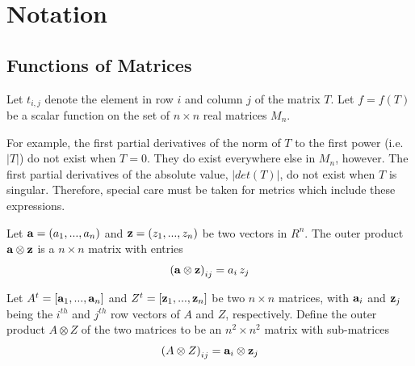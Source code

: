 \documentclass{report}
\begin{document}
\chapter{Notation}

\section{Functions of Matrices}

Let $t_{i,j}$ denote the element in row $i$ and column $j$ of the matrix $T$.
Let $f=f(T)$ be a scalar function on the set of $n \times n$ real matrices 
$M_n$. \newline

 For example, the first partial
derivatives of the norm of $T$ to the first power (i.e. $|T|$) do not exist 
when $T=0$. 
They do exist everywhere else in $M_n$, however.  The first partial 
derivatives of 
the absolute value, $|det(T)|$, do not exist when $T$ is singular. Therefore,
special care must be taken for metrics which include these expressions. 
\newline

 \newline
Let ${\bf a}=(a_1,...,a_n)$ and ${\bf z}=(z_1,...,z_n)$ be two vectors in 
$R^n$.  The outer product ${\bf a} \otimes {\bf z}$ is a $n \times n$ matrix 
with entries
\begin{eqnarray}
\left( {\bf a} \otimes {\bf z} \right)_{ij} = a_i \, z_j
\end{eqnarray}

\noindent Let $A^t = [{\bf a}_1,...,{\bf a}_n]$ and 
$Z^t = [{\bf z}_1,...,{\bf z}_n]$ be two $n \times n$ matrices,
with ${\bf a}_i$ and ${\bf z}_j$ being the $i^{th}$ and $j^{th}$ 
row vectors of $A$ and $Z$, respectively. Define the 
outer product $A \otimes Z$ of the two matrices to be an $n^2 \times n^2$ 
matrix with sub-matrices
\begin{eqnarray}
\label{matrixouter}
\left( A \otimes Z \right)_{ij} = {\bf a}_i \otimes {\bf z}_j
\end{eqnarray}
\end{document}
